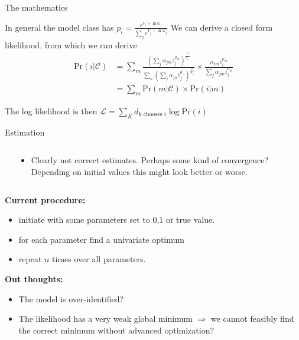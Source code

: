 \documentclass[10pt]{beamer}
\begin{document}
\begin{frame}{The mathematics}

In general the model class has $p_i = \frac{e^{V_i + \ln G_i} }{\sum_j e^{V_j + \ln G_j}}$ We can derive a closed form likelihood, from which we can derive
\begin{equation} \label{eq: likelihoodprob}
\begin{split}
\textrm{Pr}(i | \mathcal{C})  &=
\sum_m
\frac{\left(
 \sum_j \alpha_{jm} z_j^{\mu_m} \right)^{\frac{\mu}{\mu_m}}}{\sum_n \left(
  \sum_j \alpha_{jn} z_j^{\mu_n} \right)^{\frac{\mu}{\mu_n}}
} \times
\frac{\alpha_{im}z_i^{\mu_m}}{\sum_j \alpha_{jm} z_j^{\mu_m}} \\
&= \sum_m\textrm{Pr}(m | \mathcal{C}) \times \textrm{Pr}(i| m)
\end{split}
\end{equation}

The log likelihood is then $\mathcal{L} = \sum_K d_{k \textrm{ chooses } i} \log \textrm{Pr}(i)$

\end{frame}


\begin{frame}{Estimation}
  \begin{columns}[t]
  \begin{column}{.4\textwidth}
  \end{column}
  \begin{column}{.6\textwidth}
  \begin{itemize}
    \item Clearly not correct estimates. Perhaps some kind of convergence? Depending on initial values this might look better or worse.
  \end{itemize}
  \end{column}
  \end{columns}

  \textbf{Current procedure:}
  \begin{itemize}
    \item initiate with some parameters set to 0,1 or true value.
    \item for each parameter find a univariate optimum
    \item repeat $n$ times over all parameters.
  \end{itemize}

  \textbf{Out thoughts:}
  \begin{itemize}
    \item The model is over-identified?
    \item The likelihood has a very weak global minimum $\Rightarrow$ we cannot feasibly find the correct minimum without advanced optimization?
  \end{itemize}
\end{frame}
\end{document}
